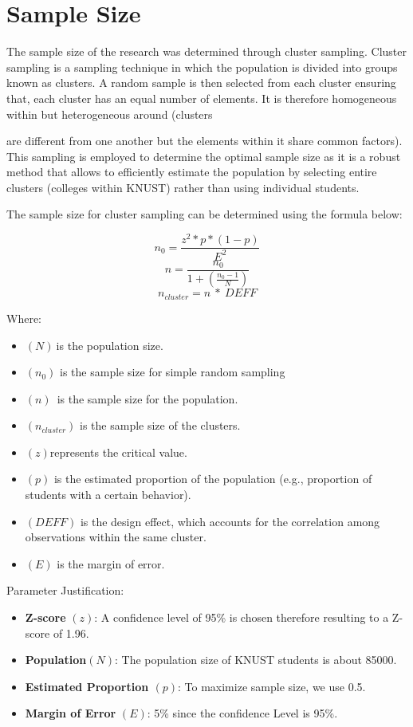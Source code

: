\documentclass[12pt]{report}
\begin{document}
	\section{Sample Size}
	
	The sample size of the research was determined through cluster sampling. Cluster sampling is a sampling technique in which the population is divided into groups known as clusters. A random sample is then selected from each cluster ensuring that, each cluster has an equal number of elements. It is therefore homogeneous within but heterogeneous around (clusters 
	
	are different from one another but the elements within it share common factors). This sampling is employed to determine the optimal sample size as it is a robust method that allows to efficiently estimate the population by selecting entire clusters (colleges within KNUST) rather than using individual students.
	
	The sample size for cluster sampling can be determined using the formula below:
	
	\[n_0=\frac{z^2\ast p\ast\left(1-p\right)}{E^2}\]
	\[n=\frac{n_0}{1+(\frac{n_0-1}{N})}\]
	\[n_{cluster}=n\ \ast\ DEFF\]
	
	Where:
	\begin{itemize}
		\item \((N)\ \)is the population size.
		\item \((n_0)\) is the sample size for simple random sampling
		\item \((n)\)\ is the sample size for the population.
		\item \((n_{cluster})\) is the sample size of the clusters.
		\item \((z) \)represents the critical value.
		\item \((p)\) is the estimated proportion of the population (e.g., proportion of students with a certain behavior).
		\item \((DEFF) \) is the design effect, which accounts for the correlation among observations within the same cluster.
		\item \((E) \) is the margin of error.
	\end{itemize}
	
	Parameter Justification:
	
	\begin{itemize}
		\item \textbf{Z-score} \((z)\): A confidence level of 95\% is chosen therefore resulting to a Z-score of 1.96.
		\item \textbf{Population}\( (N)\): The population size of KNUST students is about 85000.
		\item \textbf{Estimated Proportion \((p)\)}: To maximize sample size, we use 0.5.
		\item \textbf{Margin of Error }\((E)\): 5\% since the confidence Level is 95\%.
		
		
	\end{itemize}
	
\end{document}

